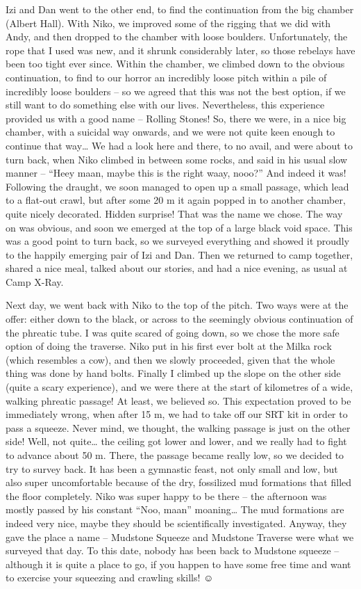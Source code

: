 Izi and Dan went to the other end, to find the continuation from the big
chamber (Albert Hall). With Niko, we improved some of the rigging that
we did with Andy, and then dropped to the chamber with loose boulders.
Unfortunately, the rope that I used was new, and it shrunk considerably
later, so those rebelays have been too tight ever since. Within the
chamber, we climbed down to the obvious continuation, to find to our
horror an incredibly loose pitch within a pile of incredibly loose
boulders -- so we agreed that this was not the best option, if we still
want to do something else with our lives. Nevertheless, this experience
provided us with a good name -- Rolling Stones! So, there we were, in a
nice big chamber, with a suicidal way onwards, and we were not quite
keen enough to continue that way\ldots{} We had a look here and there,
to no avail, and were about to turn back, when Niko climbed in between
some rocks, and said in his usual slow manner -- ``Heey maan, maybe this
is the right waay, nooo?'' And indeed it was! Following the draught, we
soon managed to open up a small passage, which lead to a flat-out crawl,
but after some 20 m it again popped in to another chamber, quite nicely
decorated. Hidden surprise! That was the name we chose. The way on was
obvious, and soon we emerged at the top of a large black void space.
This was a good point to turn back, so we surveyed everything and showed
it proudly to the happily emerging pair of Izi and Dan. Then we returned
to camp together, shared a nice meal, talked about our stories, and had
a nice evening, as usual at Camp X-Ray.

Next day, we went back with Niko to the top of the pitch. Two ways were
at the offer: either down to the black, or across to the seemingly
obvious continuation of the phreatic tube. I was quite scared of going
down, so we chose the more safe option of doing the traverse. Niko put
in his first ever bolt at the Milka rock (which resembles a cow), and
then we slowly proceeded, given that the whole thing was done by hand
bolts. Finally I climbed up the slope on the other side (quite a scary
experience), and we were there at the start of kilometres of a wide,
walking phreatic passage! At least, we believed so. This expectation
proved to be immediately wrong, when after 15 m, we had to take off our
SRT kit in order to pass a squeeze. Never mind, we thought, the walking
passage is just on the other side! Well, not quite\ldots{} the ceiling
got lower and lower, and we really had to fight to advance about 50 m.
There, the passage became really low, so we decided to try to survey
back. It has been a gymnastic feast, not only small and low, but also
super uncomfortable because of the dry, fossilized mud formations that
filled the floor completely. Niko was super happy to be there -- the
afternoon was mostly passed by his constant ``Noo, maan''
moaning\ldots{} The mud formations are indeed very nice, maybe they
should be scientifically investigated. Anyway, they gave the place a
name -- Mudstone Squeeze and Mudstone Traverse were what we surveyed
that day. To this date, nobody has been back to Mudstone squeeze --
although it is quite a place to go, if you happen to have some free time
and want to exercise your squeezing and crawling skills! ☺

